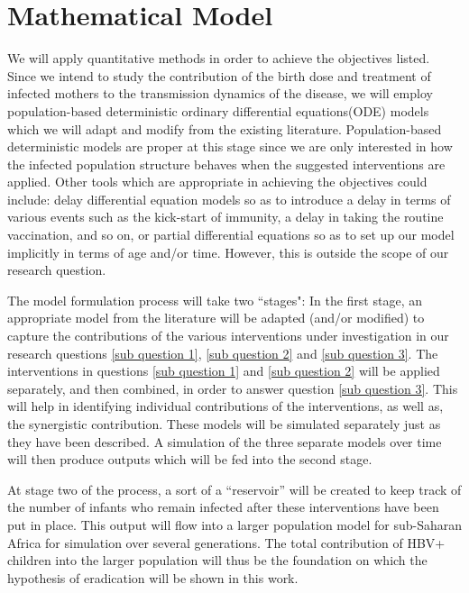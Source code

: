 \chapter{Mathematical Model}
\label{chp:MAT}
We will apply quantitative methods in order to achieve the objectives listed. Since we intend to study the contribution of the birth dose and treatment of infected mothers to the transmission dynamics of the disease, we will employ population-based deterministic ordinary differential equations(ODE) models which we will adapt and modify from the existing literature. Population-based deterministic models are proper at this stage since we are only interested in how the infected population structure behaves when the suggested interventions are applied. Other tools which are appropriate in achieving the objectives could include: delay differential equation models so as to introduce a delay in terms of various events such as the kick-start of immunity, a delay in taking the routine vaccination, and so on, or partial differential equations so as to set up our model implicitly in terms of age and/or time. However, this is outside the scope of our research question.

The model formulation process will take two ``stages":
In the first stage, an appropriate model from the literature will be adapted (and/or modified) to capture the contributions of the various interventions under investigation in our research questions \ref{sub question 1}, \ref{sub question 2} and \ref{sub question 3}. The interventions in questions \ref{sub question 1} and \ref{sub question 2} will be applied separately, and then combined, in order to answer question \ref{sub question 3}. This will help in identifying individual contributions of the interventions, as well as, the synergistic contribution.  These models will be simulated separately just as they have been described.  A simulation of the three separate models over time will then produce outputs which will be fed into the second stage. 

At stage two of the process, a sort of a ``reservoir'' will be created to keep track of the number of infants who remain infected after these interventions have been put in place. This output will flow into a larger population model for sub-Saharan Africa for simulation over several generations.  
The total contribution of HBV+ children into the larger population will thus be the foundation on which the hypothesis of eradication will be shown in this work.

